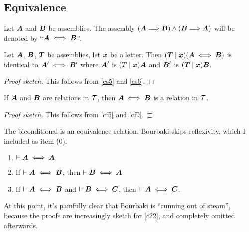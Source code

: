 \subsection{Equivalence}

\begin{definition}
Let $\boldsymbol{A}$ and $\boldsymbol{B}$ be assemblies. The
assembly
$(\boldsymbol{A}\Longrightarrow\boldsymbol{B})\land(\boldsymbol{B}\Longrightarrow\boldsymbol{A})$
will be denoted by ``$\boldsymbol{A}\iff\boldsymbol{B}$''.
\end{definition}

\begin{cs}\label{cs7}
Let $\boldsymbol{A}$, $\boldsymbol{B}$, $\boldsymbol{T}$ be
assemblies, let $\boldsymbol{x}$ be a letter. Then $(\boldsymbol{T}\mid\boldsymbol{x})(\boldsymbol{A}\iff\boldsymbol{B})$
is identical to $\boldsymbol{A}'\iff\boldsymbol{B}'$ where
$\boldsymbol{A}'$ is $(\boldsymbol{T}\mid\boldsymbol{x})\boldsymbol{A}$
and $\boldsymbol{B}'$ is $(\boldsymbol{T}\mid\boldsymbol{x})\boldsymbol{B}$.
\end{cs}

\begin{proof}[Proof sketch]
This follows from \ref{cs5} and \ref{cs6}.
\end{proof}

\begin{cf}\label{cf10}
If $\boldsymbol{A}$ and $\boldsymbol{B}$ are relations in $\mathcal{T}$,
then $\boldsymbol{A}\iff\boldsymbol{B}$ is a relation in $\mathcal{T}$.
\end{cf}

\begin{proof}[Proof sketch]
This follows from \ref{cf5} and \ref{cf9}.
\end{proof}

\begin{dc}\label{c22}
The biconditional is an equivalence relation. Bourbaki skips
reflexivity, which I included as item (0).
\begin{enumerate}[start=0]
\item $\vdash\boldsymbol{A}\iff\boldsymbol{A}$
\item If $\vdash\boldsymbol{A}\iff\boldsymbol{B}$, then $\vdash\boldsymbol{B}\iff\boldsymbol{A}$
\item If $\vdash\boldsymbol{A}\iff\boldsymbol{B}$ and $\vdash\boldsymbol{B}\iff\boldsymbol{C}$,
then $\vdash\boldsymbol{A}\iff\boldsymbol{C}$.
\end{enumerate}
\end{dc}

At this point, it's painfully clear that Bourbaki is ``running out of steam'',
because the proofs are increasingly sketch for \ref{c22}, and completely
omitted afterwards.
